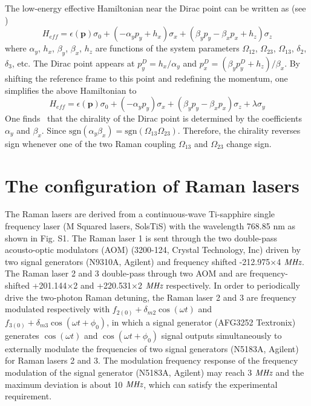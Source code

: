 \documentclass[aps,prl,twocolumn,floatfix,reprint]{revtex4}
\begin{document}
\begin{widetext}
The low-energy effective Hamiltonian near the Dirac point can be written as
(see \cite{Meng15})
\begin{equation}
H_{eff}=\epsilon (\mathbf{p})\sigma _{0}+(-\alpha _{y}p_{y}+h_{x})\sigma
_{x}+(\beta _{y}p_{y}-\beta _{x}p_{x}+h_{z})\sigma _{z}
\end{equation}%
where $\alpha _{y}$, $h_{x}$, $\beta _{y}$, $\beta _{x}$, $h_{z}$ are
functions of the system parameters $\Omega _{12}$, $\Omega _{23}$, $\Omega
_{13}$, $\delta _{2}$, $\delta _{3}$, etc. The Dirac point appears at $%
p_{y}^{D}=h_{x}/\alpha _{y}$ and $p_{x}^{D}=(\beta
_{y}p_{y}^{D}+h_{z})/\beta _{x}$. By shifting the reference frame to this
point and redefining the momentum, one simplifies the above Hamiltonian to
\begin{equation}
H_{eff}=\epsilon (\mathbf{p})\sigma _{0}+(-\alpha _{y}p_{y})\sigma
_{x}+(\beta _{y}p_{y}-\beta _{x}p_{x})\sigma _{z}+\lambda \sigma _{y}
\end{equation}%
One finds~\cite{Xiao2010} that the chirality of the Dirac point is determined by
the coefficients $\alpha _{y}$ and $\beta _{x}$. Since $\text{sgn}(\alpha
_{y}\beta _{x})=\text{sgn}(\Omega _{13}\Omega _{23})$. Therefore, the
chirality reverses sign whenever one of the two Raman coupling $\Omega _{13}$
and $\Omega _{23}$ change sign.

\section{The configuration of Raman lasers}

The Raman lasers are derived from a continuous-wave Ti-sapphire single
frequency laser (M Squared lasers, SolsTiS) with the wavelength 768.85 nm as
shown in Fig. S1. The Raman laser 1 is sent through the two double-pass
acousto-optic modulators (AOM) (3200-124, Crystal Technology, Inc) driven by
two signal generators (N9310A, Agilent) and frequency shifted -212.975$%
\times $4 $\emph{MHz}$. The Raman laser 2 and 3 double-pass through two AOM
and are frequency-shifted +201.144$\times $2 and +220.531$\times $2 $\emph{%
MHz}$ respectively. In order to periodically drive the two-photon Raman
detuning, the Raman laser 2 and 3 are frequency modulated respectively with $%
f_{2(0)}+\delta _{m2}\cos (\omega t)$ and $f_{3(0)}+\delta _{m3}\cos (\omega
t+\phi _{0})$, in which a signal generator (AFG3252 Textronix) generates $%
\cos (\omega t)$ and $\cos (\omega t+\phi _{0})$ signal outputs
simultaneously to externally modulate the frequencies of two signal
generators (N5183A, Agilent) for Raman lasers 2 and 3. The modulation
frequency response of the frequency modulation of the signal generator
(N5183A, Agilent) may reach 3 $\emph{MHz}$ and the maximum deviation is
about 10 $\emph{MHz}$, which can satisfy the experimental requirement.


\end{widetext}
\end{document}
